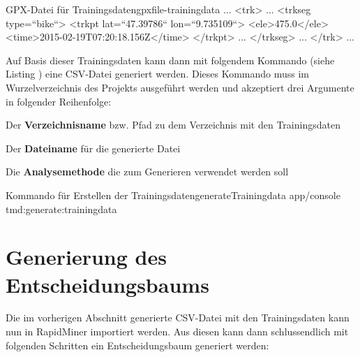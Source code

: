 \begin{code}[xml]{GPX-Datei für Trainingsdaten}{gpxfile-trainingdata}
...
    <trk>
        ...
        <trkseg type=``bike``>
            <trkpt lat=``47.39786`` lon=``9.735109``>
                <ele>475.0</ele>
                <time>2015-02-19T07:20:18.156Z</time>
            </trkpt>
            ...
        </trkseg>
        ...
    </trk>
...
\end{code}

Auf Basis dieser Trainingsdaten kann dann mit folgendem Kommando (siehe Listing ) eine CSV-Datei generiert werden. Dieses Kommando muss im Wurzelverzeichnis des Projekts ausgeführt werden und akzeptiert drei Argumente in folgender Reihenfolge:

\begin{pitemize}
\item Der \textbf{Verzeichnisname} bzw. Pfad zu dem Verzeichnis mit den Trainingsdaten
\item Der \textbf{Dateiname} für die generierte Datei
\item Die \textbf{Analysemethode} die zum Generieren verwendet werden soll
\end{pitemize}

\begin{code}[xml]{Kommando für Erstellen der Trainingsdaten}{generateTrainingdata}
app/console tmd:generate:trainingdata
\end{code}

\section*{Generierung des Entscheidungsbaums}
Die im vorherigen Abschnitt generierte CSV-Datei mit den Trainingsdaten kann nun in RapidMiner importiert werden. Aus diesen kann dann schlussendlich mit folgenden Schritten ein Entscheidungsbaum generiert werden: 

